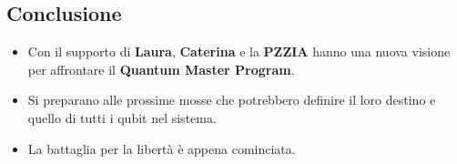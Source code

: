\subsection*{Conclusione}

\begin{itemize}
    \item Con il supporto di \textbf{Laura}, \textbf{Caterina} e la \textbf{PZZIA} hanno una nuova visione per affrontare il \textbf{Quantum Master Program}.
    \item Si preparano alle prossime mosse che potrebbero definire il loro destino e quello di tutti i qubit nel sistema.
    \item La battaglia per la libertà è appena cominciata.
\end{itemize}



